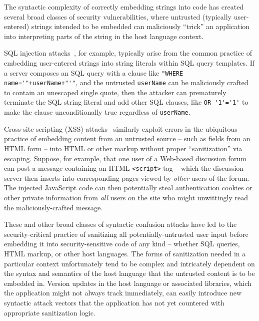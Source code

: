 The syntactic complexity of correctly embedding strings into code
has created several broad classes of security vulnerabilities,
where untrusted (typically user-entered) strings intended to be embedded
can maliciously ``trick'' an application into interpreting parts of the string
in the host language context.

SQL injection attacks~\cite{clarke12sql}, for example,
typically arise from the common practice
of embedding user-entered strings into string literals
within SQL query templates.
If a server composes an SQL query with a clause like
\verb|"WHERE name='"+userName+"'"|, 
and the untrusted \verb|userName| can be maliciously crafted
to contain an unescaped single quote,
then the attacker can prematurely terminate the SQL string literal
and add other SQL clauses, like \verb|OR '1'='1'|
to make the clause unconditionally true regardless of \verb|userName|.

Cross-site scripting (XSS) attacks~\cite{fogie07xss}
similarly exploit errors in the ubiquitous practice
of embedding content from an untrusted source --
such as fields from an HTML form --
into HTML or other markup without proper ``sanitization'' via escaping.
Suppose, for example, that one user of a Web-based discussion forum
can post a message containing an HTML \verb|<script>| tag --
which the discussion server then inserts into corresponding pages
viewed by \emph{other} users of the forum.
The injected JavaScript code can then potentially steal
authentication cookies or other private information
from \emph{all} users on the site
who might unwittingly read the maliciously-crafted message.

These and other broad classes of syntactic confusion attacks
have led to the security-critical practice
of sanitizing all potentially-untrusted user input
before embedding it into security-sensitive code of any kind --
whether SQL queries, HTML markup, or other host languages.
The forms of sanitization needed in a particular context
unfortunately tend to be complex and intricately dependent on
the syntax and semantics of the host language
that the untrusted content is to be embedded in.
Version updates in the host language or associated libraries,
which the application might not always track immediately,
can easily introduce new syntactic attack vectors
that the application
has not yet countered with appropriate sanitization logic.

